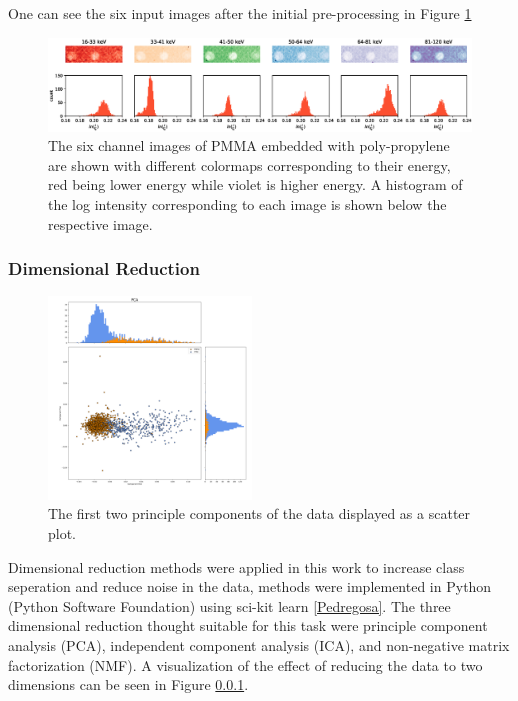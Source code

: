 \documentclass[a4paper,11pt]{article}
\begin{document}
One can see the six input images after the initial pre-processing in Figure \ref{demonstrating_bins}

\begin{figure}[htbp]

\includegraphics[width=\textwidth]{figures/poly_figure2.eps}

\caption{The six channel images of PMMA embedded with poly-propylene are shown with different colormaps corresponding to their energy, red being lower energy while violet is higher energy. A histogram of the log intensity corresponding to each image is shown below the respective image.}
\label{demonstrating_bins}
\end{figure}

\subsubsection{Dimensional Reduction}

\begin{figure}
  \vspace{-20pt}
  \begin{center}
    \includegraphics[width=0.48\textwidth]{figures/PCAnone.png}
  \end{center}
  \vspace{-20pt}
  \caption{The first two principle components of the data displayed as a scatter plot.}
  \label{PCA}
  \vspace{-10pt}
\end{figure}

Dimensional reduction methods were applied in this work to increase class seperation and reduce noise in the data, methods were implemented in Python (Python Software Foundation) using sci-kit learn \ref{Pedregosa}. The three dimensional reduction thought suitable for this task were principle component analysis (PCA), independent component analysis (ICA), and non-negative matrix factorization (NMF). A visualization of the effect of reducing the data to two dimensions can be seen in Figure \ref{}.
\end{document}
